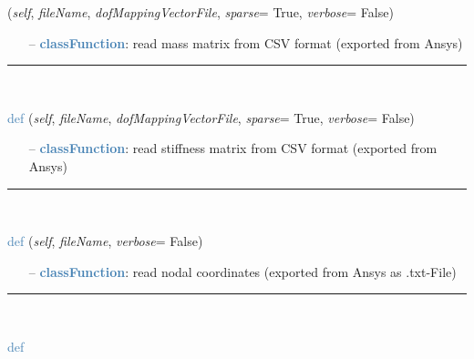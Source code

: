 \begin{itemize}[leftmargin=1.4cm]
\begin{itemize}[leftmargin=0.5cm]
\begin{itemize}[leftmargin=1.4cm]
\begin{itemize}[leftmargin=1.4cm]
\begin{itemize}[leftmargin=0.5cm]
\begin{flushleft}
({\it self}, {\it fileName}, {\it dofMappingVectorFile}, {\it sparse}= True, {\it verbose}= False)
\end{flushleft}
\setlength{\itemindent}{0.7cm}
\begin{itemize}[leftmargin=0.7cm]
  \item[--]  \textcolor{steelblue}{\bf classFunction}: read mass matrix from CSV format (exported from Ansys)\vspace{12pt}\end{itemize}
%
\noindent\rule{8cm}{0.75pt}\vspace{1pt} \\ 
\begin{flushleft}
\noindent \textcolor{steelblue}{def {\bf {}}}\label{sec:FEM:FEMinterface:ReadStiffnessMatrixFromAnsys}
({\it self}, {\it fileName}, {\it dofMappingVectorFile}, {\it sparse}= True, {\it verbose}= False)
\end{flushleft}
\setlength{\itemindent}{0.7cm}
\begin{itemize}[leftmargin=0.7cm]
  \item[--]  \textcolor{steelblue}{\bf classFunction}: read stiffness matrix from CSV format (exported from Ansys)\vspace{12pt}\end{itemize}
%
\noindent\rule{8cm}{0.75pt}\vspace{1pt} \\ 
\begin{flushleft}
\noindent \textcolor{steelblue}{def {\bf {}}}\label{sec:FEM:FEMinterface:ReadNodalCoordinatesFromAnsys}
({\it self}, {\it fileName}, {\it verbose}= False)
\end{flushleft}
\setlength{\itemindent}{0.7cm}
\begin{itemize}[leftmargin=0.7cm]
  \item[--]  \textcolor{steelblue}{\bf classFunction}: read nodal coordinates (exported from Ansys as .txt-File)\vspace{12pt}\end{itemize}
%
\noindent\rule{8cm}{0.75pt}\vspace{1pt} \\ 
\begin{flushleft}
\noindent \textcolor{steelblue}{def {\bf {}}}\label{sec:FEM:FEMinterface:ReadElementsFromAnsys}

\end{flushleft}
\end{itemize}
\end{itemize}
\end{itemize}
\end{itemize}
\end{itemize}
